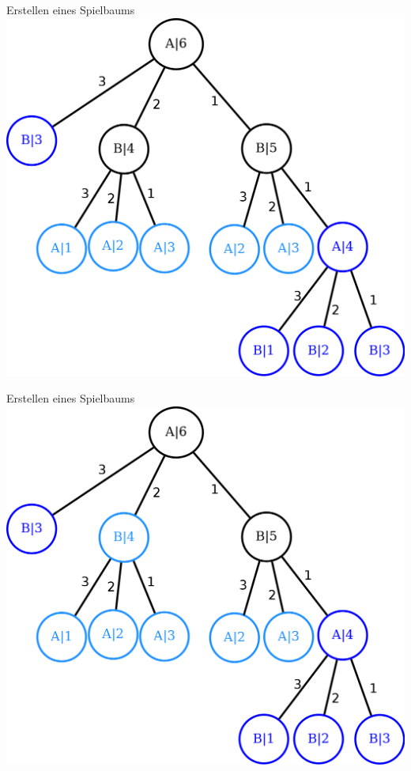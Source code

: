 \documentclass[18pt]{beamer}
\begin{document}
\begin{frame}{Erstellen eines Spielbaums}
\includegraphics[scale=0.4]{baum15.png}
\end{frame}

\begin{frame}{Erstellen eines Spielbaums}
\includegraphics[scale=0.4]{baum16.png}
\end{frame}
\end{document}
